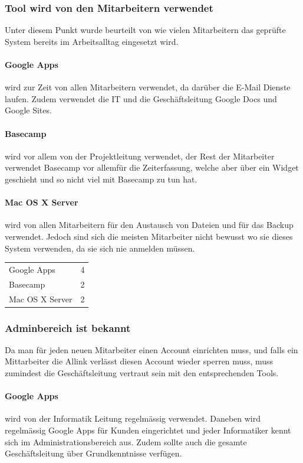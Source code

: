 \subsubsection{Tool wird von den Mitarbeitern verwendet}
\label{ssub:Tool wird von den Mitarbeitern verwendet}
Unter diesem Punkt wurde beurteilt von wie vielen Mitarbeitern das geprüfte System bereits im Arbeitsalltag eingesetzt wird.
\paragraph{Google Apps}
\label{par:1.2Google Apps}
wird zur Zeit von allen Mitarbeitern verwendet, da darüber die E-Mail Dienste laufen. Zudem verwendet die IT und die Geschäftsleitung Google Docs und Google Sites.
\paragraph{Basecamp}
\label{par:1.2Basecamp}
wird vor allem von der Projektleitung verwendet, der Rest der Mitarbeiter verwendet Basecamp vor allemfür die Zeiterfassung, welche aber über ein Widget
geschieht und so nicht viel mit Basecamp zu tun hat.
\paragraph{Mac OS X Server}
\label{par:1.2Mac OS X Server}
wird von allen Mitarbeitern für den Austausch von Dateien und für das Backup verwendet. Jedoch sind sich die meisten Mitarbeiter nicht bewusst wo sie dieses System verwenden, da sie sich nie anmelden müssen.

\begin{tabular}{lc}
Google Apps & 4\\
Basecamp & 2\\
Mac OS X Server & 2\\
\end{tabular}

\subsubsection{Adminbereich ist bekannt}
\label{ssub:Adminbereich ist bekannt}
Da man für jeden neuen Mitarbeiter einen Account einrichten muss, und falls ein Mittarbeiter die Allink verlässt diesen Account wieder sperren muss, muss zumindest die Geschäftsleitung vertraut sein mit den entsprechenden Tools.
\paragraph{Google Apps}
\label{par:1.3Google Apps}
wird von der Informatik Leitung regelmässig verwendet. Daneben wird regelmässig Google Apps für Kunden eingerichtet und jeder Informatiker kennt sich im Administrationsbereich aus. Zudem sollte auch die gesamte Geschäftsleitung über Grundkenntnisse verfügen.
